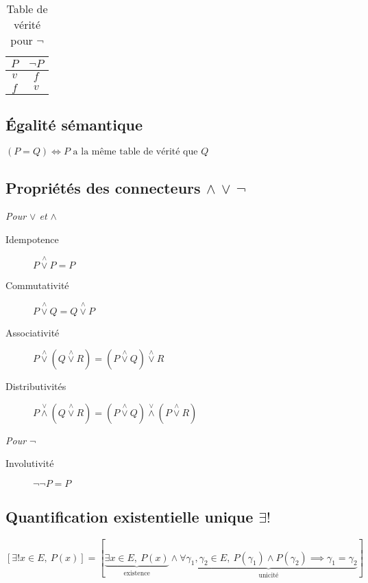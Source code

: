 \documentclass{article}
\begin{document}
\begin{table}[H]
	\centering
	\begin{tabular}{c|c}
	$P$ & $\lnot P$ \\\hline
	$v$ & $f$ \\
	$f$ & $v$
	\end{tabular}
	\caption{Table de vérité pour $\lnot$}
	\label{tab:table_vérité_non}
\end{table}

\subsection{Égalité sémantique}

$(P = Q) \iff \text{$P$ a la même table de vérité que $Q$}$

\subsection{Propriétés des connecteurs $\land$ $\lor$ $\lnot$}

\newcommand{\landor}{\stackrel{\land}{\lor}}
\newcommand{\lorand}{\stackrel{\lor}{\land}}

\emph{Pour $\lor$ et $\land$} 
\begin{description}
	\item[Idempotence] $P \landor P = P$
	\item[Commutativité] $P \landor Q = Q \landor P$
	\item[Associativité] $P \landor (Q \landor R) = (P \landor Q) \landor R$
	\item[Distributivités] $P \lorand (Q \landor R) = (P \landor Q) \lorand (P \landor R)$
\end{description}

\emph{Pour $\lnot$}
\begin{description}
	\item[Involutivité] $\lnot \lnot P = P$
\end{description}

\subsection{Quantification existentielle unique $\exists!$}

\[
	[\exists! x \in E,\ P(x)] = [\underbrace{
			\exists x \in E,\ P(x)}_{\text{existence}} \land \underbrace{
			\forall \gamma_1, \gamma_2 \in E,\ P(\gamma_1) \land P(\gamma_2) \implies \gamma_1 = \gamma_2
	}_{\text{unicité}}]
\] 
\end{document}
